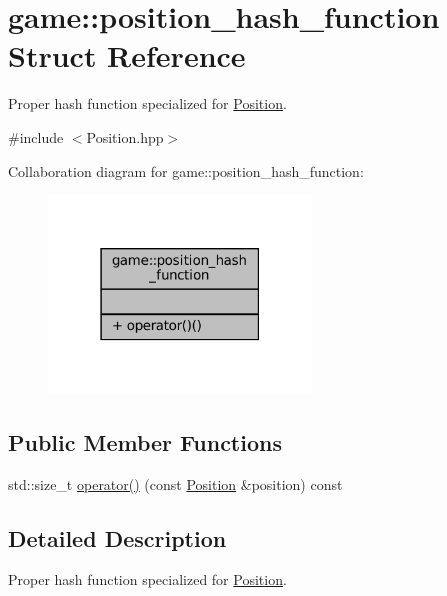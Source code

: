 \hypertarget{structgame_1_1position__hash__function}{}\section{game\+:\+:position\+\_\+hash\+\_\+function Struct Reference}
\label{structgame_1_1position__hash__function}


Proper hash function specialized for \hyperlink{structgame_1_1_position}{Position}.  




{\ttfamily \#include $<$Position.\+hpp$>$}



Collaboration diagram for game\+:\+:position\+\_\+hash\+\_\+function\+:
\nopagebreak
\begin{figure}[H]
\begin{center}
\leavevmode
\includegraphics[width=198pt]{structgame_1_1position__hash__function__coll__graph}
\end{center}
\end{figure}
\subsection*{Public Member Functions}
\begin{DoxyCompactItemize}
\item 
std\+::size\+\_\+t \hyperlink{structgame_1_1position__hash__function_a94c3eb284abc54e42be05e885bff4d9f}{operator()} (const \hyperlink{structgame_1_1_position}{Position} \&position) const
\end{DoxyCompactItemize}


\subsection{Detailed Description}
Proper hash function specialized for \hyperlink{structgame_1_1_position}{Position}. 

